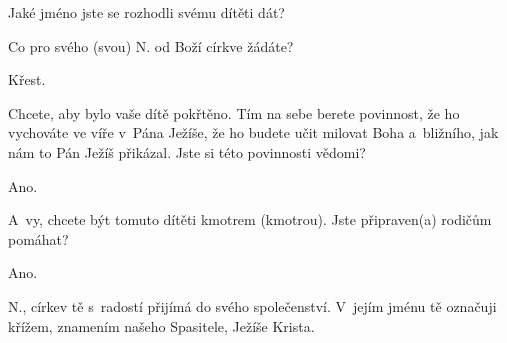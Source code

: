 
Jaké jméno jste se rozhodli svému dítěti dát?


 Co pro svého (svou) {\color{red}N.} od Boží církve žádáte?

 Křest. 	

 Chcete, aby bylo vaše dítě pokřtěno. Tím na sebe berete
povinnost, že ho vychováte ve víře v~Pána Ježíše, že ho budete učit milovat
Boha a~bližního, jak nám to Pán Ježíš přikázal. Jste si této povinnosti
vědomi?

 Ano.

 A~vy, chcete být tomuto dítěti kmotrem (kmotrou). Jste připraven(a)
rodičům pomáhat?

 Ano.

 {\color{red}N.}, církev tě s~radostí přijímá do svého
společenství. V~jejím jménu tě označuji křížem, znamením našeho Spasitele,
Ježíše Krista.

